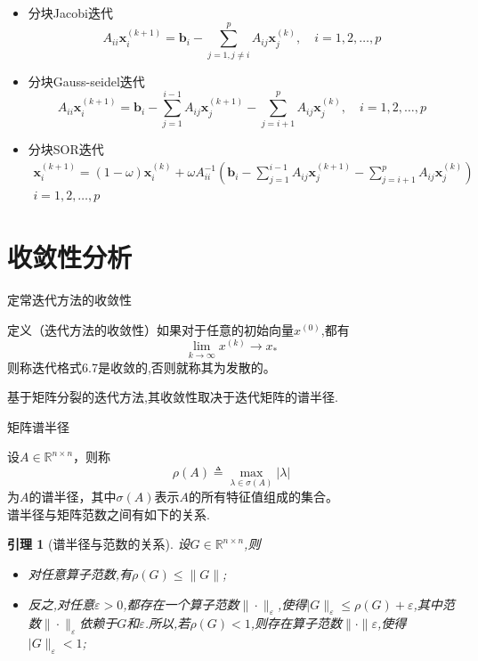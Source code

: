 \documentclass[notheorems,serif]{beamer}
\renewcommand{\normalsize}{\wuhao}
\newcommand{\wuhao}{\fontsize{10.5pt}{\baselineskip}\selectfont}
\newcommand{\hei}[1]{{\HEI#1}}
\newtheorem{lemma}{\hei{引理}}
\begin{document}
\begin{frame}
\begin{itemize}
\item {\color{blue}分块Jacobi迭代}
$$
A_{i i} \boldsymbol{x}_{i}^{(k+1)}=\boldsymbol{b}_{i}-\sum_{j=1, j \neq i}^{p} A_{i j} \boldsymbol{x}_{j}^{(k)}, \quad i=1,2, \ldots, p
$$
\item {\color{blue}分块Gauss-seidel迭代}$$
A_{i i} \boldsymbol{x}_{i}^{(k+1)}=\boldsymbol{b}_{i}-\sum_{j=1}^{i-1} A_{i j} \boldsymbol{x}_{j}^{(k+1)}-\sum_{j=i+1}^{p} A_{i j} \boldsymbol{x}_{j}^{(k)}, \quad i=1,2, \ldots, p
$$
\item {\color{blue}分块SOR迭代}$$
\begin{array}{c}{\boldsymbol{x}_{i}^{(k+1)}=(1-\omega) \boldsymbol{x}_{i}^{(k)}+\omega A_{i i}^{-1}\left(\boldsymbol{b}_{i}-\sum_{j=1}^{i-1} A_{i j} \boldsymbol{x}_{j}^{(k+1)}-\sum_{j=i+1}^{p} A_{i j} \boldsymbol{x}_{j}^{(k)}\right)} \\ {i=1,2, \ldots, p}\end{array}
$$
\end{itemize}
\end{frame}

\section{收敛性分析}

\begin{frame}
{定常迭代方法的收敛性}


{\color{blue}定义（迭代方法的收敛性）}如果对于任意的初始向量$x^{(0)}$,都有
$$\lim_{k\to \infty}x^{(k)}\to x_*$$
则称迭代格式{\color{blue}6.7}是{\color{blue}收敛}的,否则就称其为{\color{blue}发散}的。

基于矩阵分裂的迭代方法,其收敛性取决于迭代矩阵的谱半径.
\end{frame}

\begin{frame}


{\color{blue}\Large 矩阵谱半径}

\quad

\normalsize
设$A \in \mathbb{R}^{n \times n}$，则称
$$
\rho(A) \triangleq \max _{\lambda \in \sigma(A)}|\lambda|
$$
为$A$的{\color{blue}谱半径}，其中$\sigma(A)$表示$A$的所有特征值组成的集合。\\
谱半径与矩阵范数之间有如下的关系.\\

\begin{lemma}[谱半径与范数的关系]
设$G \in \mathbb{R}^{n \times n}$,则
\begin{itemize}
\item[(1)]对任意算子范数,有$\rho(G) \leq\|G\|$;
\item[(2)]反之,对任意$\varepsilon>0$,都存在一个算子范数$\|\cdot\|_{\varepsilon}$,使得$| G \|_{\varepsilon} \leq\rho(G)+\varepsilon$,其中范数$\|\cdot\|_{\varepsilon}$依赖于$G$和$\varepsilon$.所以,若$\rho(G)<1$,则存在算子范数$\|\cdot\| \varepsilon$,使得$| G \|_{\varepsilon}<1$;
\end{itemize}
\end{lemma}
\end{frame}
\end{document}
